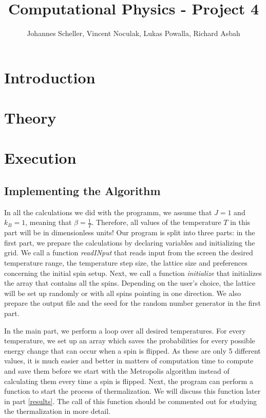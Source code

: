 \documentclass[10pt,a4paper]{article}
\author{Johannes Scheller, Vincent Noculak, Lukas Powalla, Richard Asbah}
\title{Computational Physics - Project 4}
\begin{document}
\maketitle
\newpage
\tableofcontents
\newpage

\section*{Introduction}

\section{Theory}

\section{Execution}
\subsection{Implementing the Algorithm}
In all the calculations we did with the programm, we assume that $J=1$ and $k_B=1$, meaning that $\beta=\frac{1}{T}$. Therefore, all values of the temperature $T$ in this part will be in dimensionless units!
Our program is split into three parts: in the first part, we prepare the calculations by declaring variables and initializing the grid. We call a function \emph{readINput} that reads input from the screen the desired temperature range, the temperature step size, the lattice size and preferences concerning the initial spin setup. Next, we call a function \emph{initialize} that initializes the array that contains all the spins. Depending on the user's choice, the lattice will be set up randomly or with all spins pointing in one direction. We also prepare the output file and the seed for the random number generator in the first part.

In the main part, we perform a loop over all desired temperatures. For every temperature, we set up an array which saves the probabilities for every possible energy change that can occur when a spin is flipped. As these are only 5 different values, it is much easier and better in matters of computation time to compute and save them before we start with the Metropolis algorithm instead of calculating them every time a spin is flipped.
Next, the program can perform a function to start the process of thermalization. We will discuss this function later in part \ref{results}. The call of this function should be commented out for studying the thermalization in more detail.
\end{document}
